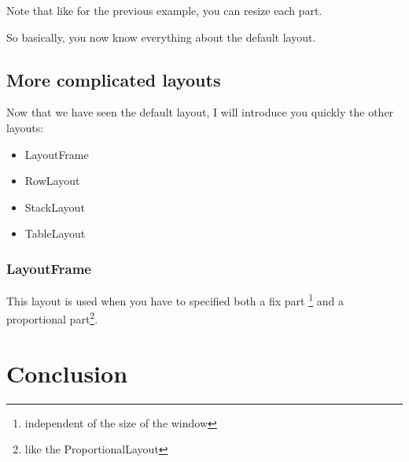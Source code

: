 \documentclass[a4paper,10pt,twoside]{book}
\begin{document}
Note that like for the previous example, you can resize each part.

So basically, you now know everything about the default layout.

\subsection{More complicated layouts}

Now that we have seen the default layout, I will introduce you quickly the other layouts:
\begin{itemize}
	\item LayoutFrame
	\item RowLayout
	\item StackLayout
	\item TableLayout
\end{itemize}

\subsubsection{LayoutFrame}

This layout is used when you have to specified both a fix part \footnote{independent of the size of the window} and a proportional part\footnote{like the ProportionalLayout}.



\section{Conclusion}

\ifx\wholebook\relax\else
   
   
\end{document}
